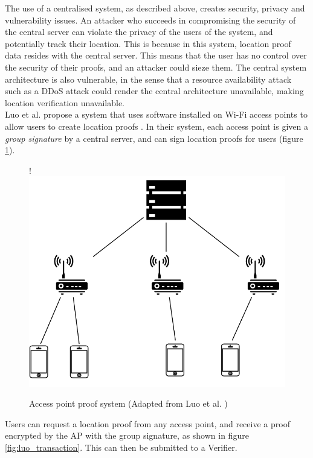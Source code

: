 The use of a centralised system, as described above, creates security, privacy and vulnerability issues. An attacker who succeeds in compromising the security of the central server can violate the privacy of the users of the system, and potentially track their location. This is because in this system, location proof data resides with the central server. This means that the user has no control over the security of their proofs, and an attacker could sieze them. The central system architecture is also vulnerable, in the sense that a resource availability attack such as a DDoS attack \cite{ddos} could render the central architecture unavailable, making location verification unavailable.
\\

Luo et al. propose a system that uses software installed on Wi-Fi access points to allow users to create location proofs \cite{luo}. In their system, each access point is given a \textit{group signature} by a central server, and can sign location proofs for users (figure \ref{fig:luo_diagram}).

\begin{figure}[H]
\begin{center}
 {!} {\includegraphics{diagrams/ap_paper.png}}
\caption{Access point proof system (Adapted from Luo et al. \cite{luo})}
\label{fig:luo_diagram}
\end{center}
\end{figure}

Users can request a location proof from any access point, and receive a proof encrypted by the AP with the group signature, as shown in figure \ref{fig:luo_transaction}. This can then be submitted to a Verifier.

